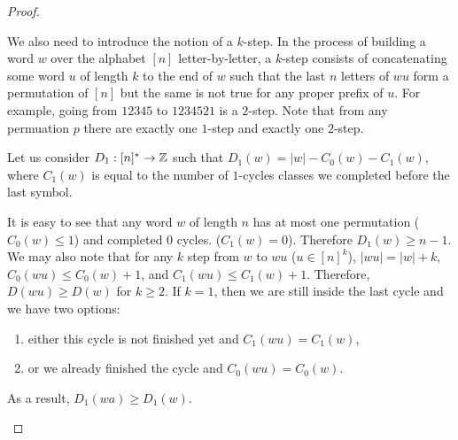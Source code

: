 \begin{proof}
\begin{itemize}
      We also need to introduce the notion of a $k$-step. In the process of
      building a word $w$ over the alphabet $[n]$ letter-by-letter, a $k$-step
      consists of concatenating some word $u$ of length $k$ to the end of $w$
      such that the last $n$ letters of $wu$ form a permutation of $[n]$ but the
      same is not true for any proper prefix of $u$. For example,
      going from $12345$ to $1234521$ is a $2$-step. Note that from any
      permuation $p$ there are exactly one $1$-step and exactly one $2$-step.

      Let us consider $D_1 : [n]^* \to \mathbb{Z}$
      such that $D_1(w) = |w| - C_0(w) - C_1(w)$, where $C_1(w)$ is equal to
      the number of $1$-cycles classes we completed before the last symbol.

      It is easy to see that any word $w$ of length $n$ has at most one
      permutation ($C_0(w) \le 1$) and completed $0$ cycles.
      ($C_1(w) = 0$). Therefore $D_1(w) \ge n - 1$. We may also
      note that for any $k$ step from $w$ to $wu$ ($u \in [n]^k$),
      $|wu| = |w| + k$, $C_0(wu) \le C_0(w) + 1$, and $C_1(wu) \le C_1(w) + 1$.
      Therefore, $D(wu) \ge D(w)$ for $k \ge 2$. If $k = 1$, then we are still
      inside the last cycle and we have two options:
      \begin{enumerate}
        \item either this cycle is not finished yet and $C_1(wu) = C_1(w)$,
        \item or we already finished the cycle and $C_0(wu) = C_0(w)$.
      \end{enumerate}
      As a result, $D_1(wa) \ge D_1(w)$.


\end{itemize}
\end{proof}
